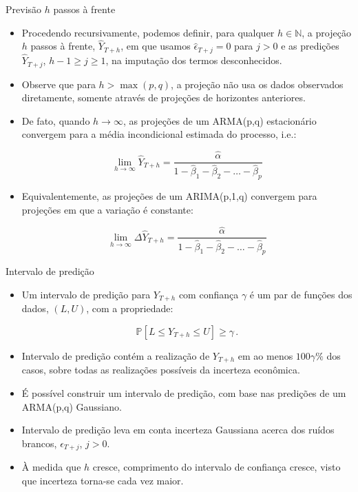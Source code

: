 \documentclass[11pt]{beamer}
\newenvironment{halfwideitemize}{\itemize\addtolength{\itemsep}{0.5em}}{\enditemize}
\begin{document}
\begin{frame}{Previsão $h$ passos à frente}
	\begin{itemize}
		\item Procedendo recursivamente, podemos definir, para qualquer $h \in \mathbb{N}$, a projeção $h$ passos à frente, $\hat Y_{T+h}$, em que usamos $\hat \epsilon_{T+j} = 0$ para $j > 0$ e as predições $\hat Y_{T+j}$, $h-1 \geq j \geq 1$, na imputação dos termos desconhecidos.
		\item Observe que para $h > \operatorname{max}(p,q)$, a projeção não usa os dados observados diretamente, somente através de projeções de horizontes anteriores.
		\item De fato, quando $h \to \infty$, as projeções de um ARMA(p,q) estacionário convergem para a média incondicional estimada do processo, i.e.:
		
		$$\lim_{h \to \infty} \hat Y_{T+h} = \frac{\hat \alpha}{1-\hat \beta_1  - \hat \beta_2 - \ldots - \hat \beta_p}$$
		
		\item Equivalentemente, as projeções de um ARIMA(p,1,q) convergem para projeções em que a variação é constante:
		
		$$\lim_{h \to \infty} \Delta \hat Y_{T+h} = \frac{\hat \alpha}{1-\hat \beta_1  - \hat \beta_2 - \ldots - \hat \beta_p}$$
		
	\end{itemize}
\end{frame}

\begin{frame}{Intervalo de predição}
	\begin{itemize}
		\item Um intervalo de predição para $Y_{T+h}$ com confiança $\gamma$ é um par de funções dos dados, $(L,U)$, com a propriedade:
		
		$$\mathbb{P}[L \leq Y_{T+h} \leq U] \geq \gamma\, .$$
		\item Intervalo de predição contém a realização de $Y_{T+h}$ em ao menos $100 \gamma\%$ dos casos, sobre todas as realizações possíveis da incerteza econômica.
		\item É possível construir um intervalo de predição, com base nas predições de um ARMA(p,q) Gaussiano.
		\begin{halfwideitemize}
			\item Intervalo de predição leva em conta incerteza Gaussiana acerca dos ruídos brancos, $\epsilon_{T+j}$, $j > 0$.
		\end{halfwideitemize}
		\item À medida que $h$ cresce, comprimento do intervalo de confiança cresce, visto que incerteza torna-se cada vez maior.
	\end{itemize}
	
\end{frame}
\end{document}
